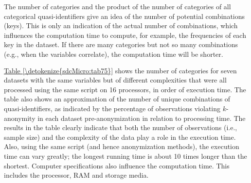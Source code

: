 \documentclass[letterpaper,10pt,english]{sphinxmanual}
\begin{document}
The number of categories and the product of the number of categories of
all categorical quasi-identifiers give an idea of the number of
potential combinations (keys). This is only an indication of the actual
number of combinations, which influences the computation time to
compute, for example, the frequencies of each key in the dataset. If
there are many categories but not so many combinations (e.g., when the
variables correlate), the computation time will be shorter.

\hyperref[\detokenize{sdcMicro:tab75}]{Table \ref{\detokenize{sdcMicro:tab75}}} shows the number of categories for seven datasets with the
same variables but of different complexities that were all processed
using the same script on 16 processors, in order of execution time. The
table also shows an approximation of the number of unique combinations
of quasi-identifiers, as indicated by the percentage of observations
violating \(k\)-anonymity in each dataset pre-anonymization in
relation to processing time. The results in the table clearly indicate
that both the number of observations (i.e., sample size) and the
complexity of the data play a role in the execution time. Also, using
the same script (and hence anonymization methods), the execution time
can vary greatly; the longest running time is about 10 times longer than
the shortest. Computer specifications also influence the computation
time. This includes the processor, RAM and storage media.
\end{document}
